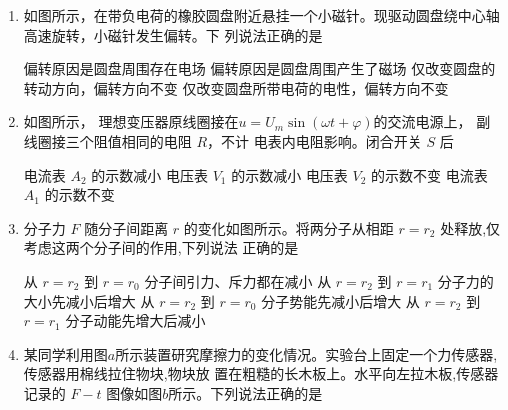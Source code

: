 \begin{enumerate}
\item
如图所示，在带负电荷的橡胶圆盘附近悬挂一个小磁针。现驱动圆盘绕中心轴高速旋转，小磁针发生偏转。下
列说法正确的是  
\begin{figure}[h!]
\centering

\end{figure}


\fourchoices
{偏转原因是圆盘周围存在电场}
{偏转原因是圆盘周围产生了磁场}
{仅改变圆盘的转动方向，偏转方向不变}
{仅改变圆盘所带电荷的电性，偏转方向不变}


\item
如图所示， 理想变压器原线圈接在$u=U_{m} \sin (\omega t+\varphi)$的交流电源上， 副线圈接三个阻值相同的电阻 $ R $，不计
电表内电阻影响。闭合开关 $ S $ 后  
\begin{figure}[h!]
\centering

\end{figure}


\fourchoices
{电流表 $ A_{2} $ 的示数减小}
{电压表 $ V_{1} $ 的示数减小}
{电压表 $ V_{2} $ 的示数不变}
{电流表 $ A_{1} $ 的示数不变}


\item
分子力 $ F $ 随分子间距离 $ r $ 的变化如图所示。将两分子从相距 $ r = r_{2} $ 处释放,仅考虑这两个分子间的作用,下列说法
正确的是  
\begin{figure}[h!]
\centering

\end{figure}


\fourchoices
{从 $r=r_{2}$ 到 $r=r_{0}$ 分子间引力、斥力都在减小}
{从 $r=r_{2}$ 到 $r=r_{1}$ 分子力的大小先减小后增大}
{从 $r=r_{2}$ 到 $r=r_{0}$ 分子势能先减小后增大}
{从 $r=r_{2}$ 到 $r=r_{1}$ 分子动能先增大后减小}




\item
某同学利用图$ a $所示装置研究摩擦力的变化情况。实验台上固定一个力传感器,传感器用棉线拉住物块,物块放
置在粗糙的长木板上。水平向左拉木板,传感器记录的 $ F - t $ 图像如图$ b $所示。下列说法正确的是  
\begin{figure}[h!]
\centering
\begin{subfigure}{0.4\linewidth}
\centering
 
\caption{}\label{}
\end{subfigure}
\hfil
\begin{subfigure}{0.46\linewidth}
\centering
 
\caption{}\label{}
\end{subfigure}
\end{figure}


\end{enumerate}

